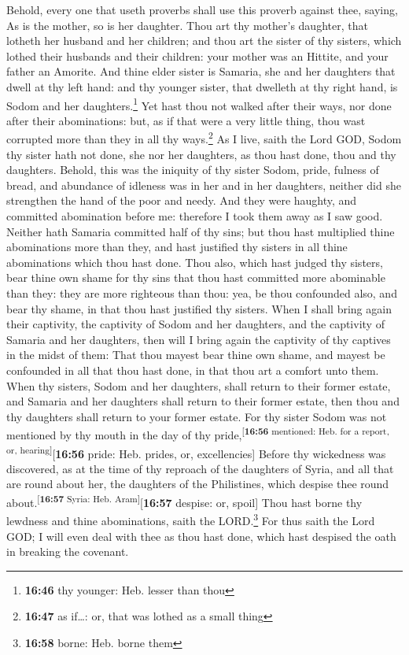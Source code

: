  Behold, every one that useth proverbs shall use this
proverb against thee, saying, As is the mother, so is her daughter.
 Thou art thy mother's daughter, that lotheth her husband
and her children; and thou art the sister of thy sisters, which lothed
their husbands and their children: your mother was an Hittite, and your
father an Amorite.  And thine elder sister is Samaria,
she and her daughters that dwell at thy left hand: and thy younger
sister, that dwelleth at thy right hand, is Sodom and her
daughters.\footnote{\textbf{16:46} thy younger: Heb. lesser than thou}
 Yet hast thou not walked after their ways, nor done
after their abominations: but, as if that were a very little thing, thou
wast corrupted more than they in all thy ways.\footnote{\textbf{16:47}
  as if\ldots: or, that was lothed as a small thing}  As
I live, saith the Lord GOD, Sodom thy sister hath not done, she nor her
daughters, as thou hast done, thou and thy daughters. 
Behold, this was the iniquity of thy sister Sodom, pride, fulness of
bread, and abundance of idleness was in her and in her daughters,
neither did she strengthen the hand of the poor and needy.
 And they were haughty, and committed abomination before
me: therefore I took them away as I saw good.  Neither
hath Samaria committed half of thy sins; but thou hast multiplied thine
abominations more than they, and hast justified thy sisters in all thine
abominations which thou hast done.  Thou also, which hast
judged thy sisters, bear thine own shame for thy sins that thou hast
committed more abominable than they: they are more righteous than thou:
yea, be thou confounded also, and bear thy shame, in that thou hast
justified thy sisters.  When I shall bring again their
captivity, the captivity of Sodom and her daughters, and the captivity
of Samaria and her daughters, then will I bring again the captivity of
thy captives in the midst of them:  That thou mayest bear
thine own shame, and mayest be confounded in all that thou hast done, in
that thou art a comfort unto them.  When thy sisters,
Sodom and her daughters, shall return to their former estate, and
Samaria and her daughters shall return to their former estate, then thou
and thy daughters shall return to your former estate. 
For thy sister Sodom was not mentioned by thy mouth in the day of thy
pride,\textsuperscript{{[}\textbf{16:56} mentioned: Heb. for a report,
or, hearing{]}}{[}\textbf{16:56} pride: Heb. prides, or, excellencies{]}
 Before thy wickedness was discovered, as at the time of
thy reproach of the daughters of Syria, and all that are round about
her, the daughters of the Philistines, which despise thee round
about.\textsuperscript{{[}\textbf{16:57} Syria: Heb.
Aram{]}}{[}\textbf{16:57} despise: or, spoil{]}  Thou
hast borne thy lewdness and thine abominations, saith the
LORD.\footnote{\textbf{16:58} borne: Heb. borne them} 
For thus saith the Lord GOD; I will even deal with thee as thou hast
done, which hast despised the oath in breaking the covenant.

